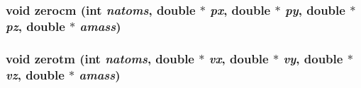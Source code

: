 \subsubsection{\setlength{\rightskip}{0pt plus 5cm}void zerocm (int {\em natoms}, double $\ast$ {\em px}, double $\ast$ {\em py}, double $\ast$ {\em pz}, double $\ast$ {\em amass})}\label{md__zeroam_8c_f477a4eb137e7d7e794f641dfab3d479}


\subsubsection{\setlength{\rightskip}{0pt plus 5cm}void zerotm (int {\em natoms}, double $\ast$ {\em vx}, double $\ast$ {\em vy}, double $\ast$ {\em vz}, double $\ast$ {\em amass})}\label{md__zeroam_8c_fdeef22a0c32a1124eec957850479ff0}


